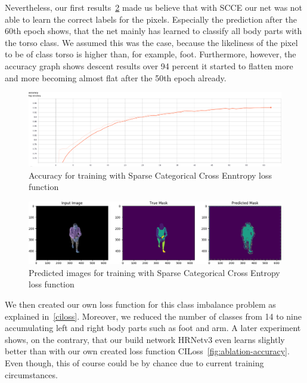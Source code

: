 Nevertheless, our first results~\ref{fig:cross_entropy_pred_img} made us believe that with SCCE our net was not able to
learn the correct labels for the pixels.
Especially the prediction after the 60th epoch shows, that the net mainly has learned to classify all body parts with the
torso class.
We assumed this was the case, because the likeliness of the pixel to be of class torso is higher than, for
example, foot.
Furthermore, however, the accuracy graph shows descent results over 94 percent it started to flatten more and more becoming
almost flat after the 50th epoch already.
\begin{figure}[H]
    \centering
    \includegraphics[width=\textwidth,height=\textheight,keepaspectratio]{Figures/accuracy_cross_entropy.png}
    \decoRule
    \caption[Loss Functions SCCE: Accuracy]{Accuracy for training with Sparse Categorical Cross Enntropy loss function}
    \label{fig:accuracy_cross_entropy}
\end{figure}
\begin{figure}[H]
    \centering
    \includegraphics[width=\textwidth,height=\textheight,keepaspectratio]{Figures/crossentropy_imgs_prediction_last_epoch.png}
    \decoRule
    \caption[Loss Functions SCCE: predictions]{Predicted images for training with Sparse Categorical Cross Entropy loss function}
    \label{fig:cross_entropy_pred_img}
\end{figure}
We then created our own loss function for this class imbalance problem as explained in~\autoref{ciloss}.
Moreover, we reduced the number of classes from 14 to nine accumulating left and right body parts such as foot and arm.
A later experiment shows, on the contrary, that our build network HRNetv3 even learns slightly better than with our own created
loss function CILoss~\ref{fig:ablation-accuracy}.
Even though, this of course could be by chance due to current training circumstances.


